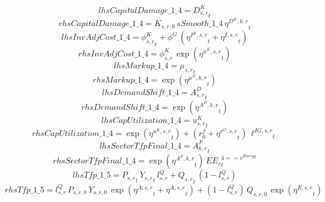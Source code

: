 \begin{dmath*}
lhsCapitalDamage\_1\_4 = {{D^K_{s,r}}}_{t}
\end{dmath*}
\begin{dmath*}
rhsCapitalDamage\_1\_4 = {{K_{s,r,0}}}\, {sSmooth\_1\_4}\, {{\eta^{D^{K},k,r}}}_{t}
\end{dmath*}
\begin{dmath*}
lhsInvAdjCost\_1\_4 = {{\phi^K_{s,r}}}_{t}+{{\phi^{G}}}\, \left({{\eta^{P^k,s,r}}}_{t}+{{\eta^{I,s,r}}}_{t}\right)
\end{dmath*}
\begin{dmath*}
rhsInvAdjCost\_1\_4 = {{\phi^{K}_{s,r}}}\, \exp\left({{\eta^{\phi^{K},{s,r}}}}_{t}\right)
\end{dmath*}
\begin{dmath*}
lhsMarkup\_1\_4 = {{\mu_{s,r}}}_{t}
\end{dmath*}
\begin{dmath*}
rhsMarkup\_1\_4 = \exp\left({{\eta^{\mu^{N},k,r}}}_{t}\right)
\end{dmath*}
\begin{dmath*}
lhsDemandShift\_1\_4 = {{A^{D}_{s,r}}}_{t}
\end{dmath*}
\begin{dmath*}
rhsDemandShift\_1\_4 = \exp\left({{\eta^{A^{D},k,r}}}_{t}\right)
\end{dmath*}
\begin{dmath*}
lhsCapUtilization\_1\_4 = {{u^K_{s,r}}}_{t}
\end{dmath*}
\begin{dmath*}
rhsCapUtilization\_1\_4 = \exp\left({{\eta^{u^K,s,r}}}_{t}\right)+\left({{r^f_0}}+{{\eta^{r^G,s,r}}}_{t}\right)\, {{\ell^{IG,s,r}}}_{t}
\end{dmath*}
\begin{dmath*}
lhsSectorTfpFinal\_1\_4 = {{A^{F}_{k,r}}}_{t}
\end{dmath*}
\begin{dmath*}
rhsSectorTfpFinal\_1\_4 = \exp\left({{\eta^{A^F,k,r}}}_{t}\right)\, {{EE_r}}_{t}^{4=={{s^{Energy}}}}
\end{dmath*}
\begin{dmath*}
lhsTfp\_1\_5 = {{P_{s,r}}}_{t}\, {{Y_{s,r}}}_{t}\, {{l^{Q}_{s,r}}}+{{Q_{s,r}}}_{t}\, \left(1-{{l^{Q}_{s,r}}}\right)
\end{dmath*}
\begin{dmath*}
rhsTfp\_1\_5 = {{l^{Q}_{s,r}}}\, {{P_{s,r,0}}}\, {{Y_{s,r,0}}}\, \exp\left({{\eta^{A,s,r}}}_{t}+{{\eta^{A,s,r}}}_{t}\right)+\left(1-{{l^{Q}_{s,r}}}\right)\, {{Q_{s,r,0}}}\, \exp\left({{\eta^{E,s,r}}}_{t}\right)
\end{dmath*}
